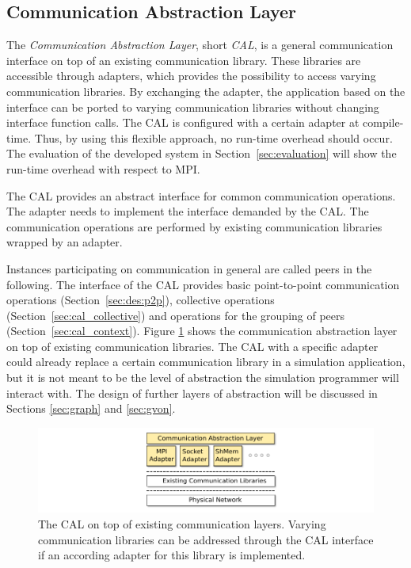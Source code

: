 \subsection{Communication Abstraction Layer}
\label{sec:cal}

The \textit{Communication Abstraction Layer}, short \textit{CAL}, is a
general communication interface on top of an existing communication
library. These libraries are accessible through adapters, which
provides the possibility to access varying communication libraries. By
exchanging the adapter, the application based on the interface can be
ported to varying communication libraries without changing interface
function calls. The CAL is configured with a certain adapter at
compile-time. Thus, by using this flexible approach, no run-time
overhead should occur. The evaluation of the developed system in
Section~\ref{sec:evaluation} will show the run-time overhead with
respect to MPI.

The CAL provides an abstract interface for common communication
operations. The adapter needs to implement the interface demanded by
the CAL.  The communication operations are performed by existing
communication libraries wrapped by an adapter.

Instances participating on communication in general are called peers
in the following.  The interface of the CAL provides basic
point-to-point communication operations (Section~\ref{sec:des:p2p}),
collective operations (Section~\ref{sec:cal_collective}) and
operations for the grouping of peers (Section~\ref{sec:cal_context}).
Figure \ref{fig:cal} shows the communication abstraction layer on top
of existing communication libraries.  The CAL with a specific adapter
could already replace a certain communication library in a simulation
application, but it is not meant to be the level of abstraction the
simulation programmer will interact with. The design of further layers
of abstraction will be discussed in Sections \ref{sec:graph} and
\ref{sec:gvon}.

\begin{figure}[H]
  \centering
  \includegraphics[width=\textwidth]{graphics/30_design_cal}
  \caption{The CAL on top of existing communication layers. Varying
    communication libraries can be addressed through the CAL interface
    if an according adapter for this library is implemented.}
  \label{fig:cal}
\end{figure}


